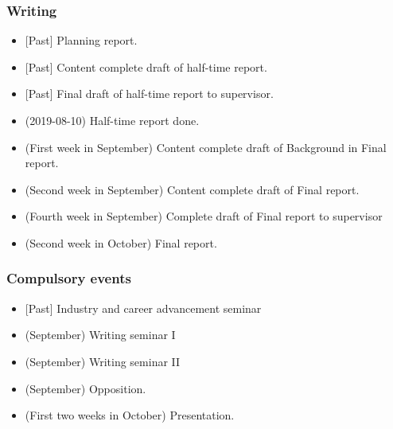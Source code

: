 \documentclass[parskip=half]{scrartcl}
\begin{document}
\subsubsection*{Writing}
\begin{itemize}
  \item \textit{\color{gray}}[Past] Planning report.
  \item \textit{\color{gray}}[Past] Content complete draft of half-time report.
  \item \textit{\color{gray}}[Past] Final draft of half-time report to supervisor.
  \item (2019-08-10) Half-time report done.
  \item (First week in September) Content complete draft of Background in Final
    report.
  \item (Second week in September) Content complete draft of Final report.
  \item (Fourth week in September) Complete draft of Final report to supervisor
  \item (Second week in October) Final report.
\end{itemize}

\subsubsection*{Compulsory events}
\begin{itemize}
  \item \textit{\color{gray}}[Past] Industry and career advancement seminar
  \item (September) Writing seminar I
  \item (September) Writing seminar II
  \item (September) Opposition.
  \item (First two weeks in October) Presentation.
\end{itemize}



% 

\newpage
\printbibliography{}
\end{document}
